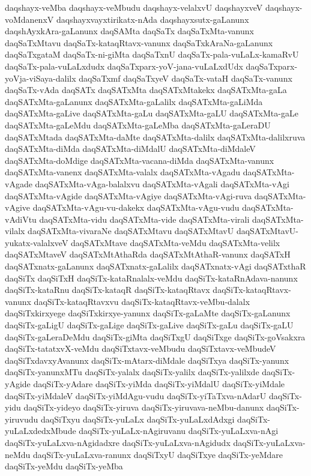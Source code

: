 {daqshayx-veMba
daqshayx-veMbudu
daqshayx-velalxvU
daqshayxveV
daqshayx-voMdanenxV
daqshayxvayxtirikatx-nAda
daqshayxsutx-gaLanunx
daqshAyxkAra-gaLanunx
daqSAMta
daqSaTx
daqSaTxMta-vanunx
daqSaTxMtavu
daqSaTx-kataqRtavx-vanunx
daqSaTxkAraNa-gaLanunx
daqSaTxgataM
daqSaTx-ni-giMta
daqSaTxnU
daqSaTx-pala-vuLaLx-kamaRvU
daqSaTx-pala-vuLaLxdudx
daqSaTxparx-yoV-jana-vuLaLxdUdx
daqSaTxparx-yoVja-viSaya-dalilx
daqSaTxmf
daqSaTxyeV
daqSaTx-vataH
daqSaTx-vanunx
daqSaTx-vAda
daqSATx
daqSATxMta
daqSATxMtakekx
daqSATxMta-gaLa
daqSATxMta-gaLanunx
daqSATxMta-gaLalilx
daqSATxMta-gaLiMda
daqSATxMta-gaLive
daqSATxMta-gaLu
daqSATxMta-gaLU
daqSATxMta-gaLe
daqSATxMta-gaLeMdu
daqSATxMta-gaLeMba
daqSATxMta-gaLeraDU
daqSATxMtada
daqSATxMta-daMte
daqSATxMta-dalilx
daqSATxMta-dalilxruva
daqSATxMta-diMda
daqSATxMta-diMdalU
daqSATxMta-diMdaleV
daqSATxMta-doMdige
daqSATxMta-vacana-diMda
daqSATxMta-vanunx
daqSATxMta-vanenx
daqSATxMta-valalx
daqSATxMta-vAgadu
daqSATxMta-vAgade
daqSATxMta-vAga-balalxvu
daqSATxMta-vAgali
daqSATxMta-vAgi
daqSATxMta-vAgide
daqSATxMta-vAgiye
daqSATxMta-vAgi-ruva
daqSATxMta-vAgive
daqSATxMta-vAgu-vu-dakekx
daqSATxMta-vAgu-vudu
daqSATxMta-vAdiVtu
daqSATxMta-vidu
daqSATxMta-vide
daqSATxMta-virali
daqSATxMta-vilalx
daqSATxMta-vivaraNe
daqSATxMtavu
daqSATxMtavU
daqSATxMtavU-yukatx-valalxveV
daqSATxMtave
daqSATxMta-veMdu
daqSATxMta-velilx
daqSATxMtaveV
daqSATxMtAthaRda
daqSATxMtAthaR-vanunx
daqSATxH
daqSATxnatx-gaLanunx
daqSATxnatx-gaLalilx
daqSATxnatx-vAgi
daqSATxthaR
daqSiTx
daqSiTxH
daqSiTx-kataRnalalx-veMdu
daqSiTx-kataRnAdava-nanunx
daqSiTx-kataRnu
daqSiTx-kataqR
daqSiTx-kataqRtavx
daqSiTx-kataqRtavx-vanunx
daqSiTx-kataqRtavxvu
daqSiTx-kataqRtavx-veMbu-dalalx
daqSiTxkirxyege
daqSiTxkirxye-yanunx
daqSiTx-gaLaMte
daqSiTx-gaLanunx
daqSiTx-gaLigU
daqSiTx-gaLige
daqSiTx-gaLive
daqSiTx-gaLu
daqSiTx-gaLU
daqSiTx-gaLeraDeMdu
daqSiTx-giMta
daqSiTxgU
daqSiTxge
daqSiTx-goVsakxra
daqSiTx-tatatxvX-veMdu
daqSiTxtavx-veMbudu
daqSiTxtavx-veMbudeV
daqSiTxdavxyAvanunx
daqSiTx-mAtarx-diMdale
daqSiTxya
daqSiTx-yanunx
daqSiTx-yanunxMTu
daqSiTx-yalalx
daqSiTx-yalilx
daqSiTx-yalilxde
daqSiTx-yAgide
daqSiTx-yAdare
daqSiTx-yiMda
daqSiTx-yiMdalU
daqSiTx-yiMdale
daqSiTx-yiMdaleV
daqSiTx-yiMdAgu-vudu
daqSiTx-yiTaTxva-nAdarU
daqSiTx-yidu
daqSiTx-yideyo
daqSiTx-yiruva
daqSiTx-yiruvava-neMbu-danunx
daqSiTx-yiruvudu
daqSiTxyu
daqSiTx-yuLaLx
daqSiTx-yuLaLxdAdxgi
daqSiTx-yuLaLxdedxMbude
daqSiTx-yuLaLx-nAgiruvanu
daqSiTx-yuLaLxva-nAgi
daqSiTx-yuLaLxva-nAgidadxre
daqSiTx-yuLaLxva-nAgidudx
daqSiTx-yuLaLxva-neMdu
daqSiTx-yuLaLxva-ranunx
daqSiTxyU
daqSiTxye
daqSiTx-yeMdare
daqSiTx-yeMdu
daqSiTx-yeMba
}
